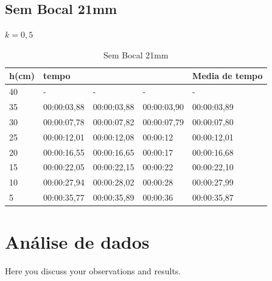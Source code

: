 \documentclass[12pt]{article}
\begin{document}
\subsection[short]{Sem Bocal 21mm}
$ k = 0,5 $
\begin{table}[H]
    \begin{tabular}{|l|lll|l|}
        \hline
        h(cm) & tempo                            &                                  &             & Media de tempo \\ \hline
        40    & \multicolumn{1}{l|}{-}           & \multicolumn{1}{l|}{-}           & -           & -              \\ \hline
        35    & \multicolumn{1}{l|}{00:00:03,88} & \multicolumn{1}{l|}{00:00:03,88} & 00:00:03,90 & 00:00:03,89    \\ \hline
        30    & \multicolumn{1}{l|}{00:00:07,78} & \multicolumn{1}{l|}{00:00:07,82} & 00:00:07,79 & 00:00:07,80    \\ \hline
        25    & \multicolumn{1}{l|}{00:00:12,01} & \multicolumn{1}{l|}{00:00:12,08} & 00:00:12    & 00:00:12,01    \\ \hline
        20    & \multicolumn{1}{l|}{00:00:16,55} & \multicolumn{1}{l|}{00:00:16,65} & 00:00:17    & 00:00:16,68    \\ \hline
        15    & \multicolumn{1}{l|}{00:00:22,05} & \multicolumn{1}{l|}{00:00:22,15} & 00:00:22    & 00:00:22,10    \\ \hline
        10    & \multicolumn{1}{l|}{00:00:27,94} & \multicolumn{1}{l|}{00:00:28,02} & 00:00:28    & 00:00:27,99    \\ \hline
        5     & \multicolumn{1}{l|}{00:00:35,77} & \multicolumn{1}{l|}{00:00:35,89} & 00:00:36    & 00:00:35,87    \\ \hline
    \end{tabular}
    \caption{Sem Bocal 21mm}
\end{table}


\section{Análise de dados}
Here you discuss your observations and results.
\end{document}
